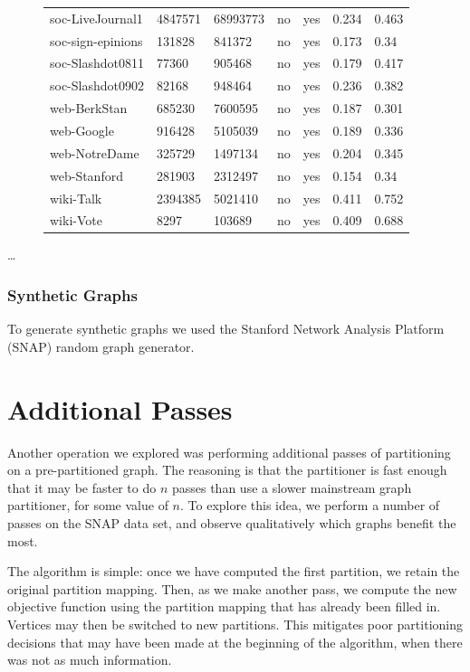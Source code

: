 \documentclass[11pt]{article}
\begin{document}
\begin{figure}
{\begin{tabular}{ *7l }
soc-LiveJournal1 & 4847571 & 68993773 & no & yes &0.234& 0.463\\ 
soc-sign-epinions & 131828 & 841372 & no & yes &0.173&0.34\\ 
soc-Slashdot0811 & 77360 & 905468 & no & yes &0.179&0.417\\ 
soc-Slashdot0902 & 82168 & 948464 & no & yes &0.236&0.382\\ 
web-BerkStan & 685230 & 7600595 & no & yes &0.187&0.301\\ 
web-Google & 916428 & 5105039 & no & yes &0.189&0.336\\ 
web-NotreDame & 325729 & 1497134 & no & yes &0.204&0.345\\ 
web-Stanford & 281903 & 2312497 & no & yes &0.154&0.34\\ 
wiki-Talk & 2394385 & 5021410 & no & yes &0.411&0.752\\ 
wiki-Vote  & 8297 & 103689 & no & yes &0.409&0.688\\ 
 \hline
\end{tabular}\par
}
\end{figure}

\dots

\subsubsection{Synthetic Graphs}
To generate synthetic graphs we used the Stanford Network Analysis Platform (SNAP) random graph generator.

\section{Additional Passes}
Another operation we explored was performing additional passes of partitioning on a pre-partitioned graph. The reasoning is that the partitioner is fast enough that it may be faster to do $n$ passes than use a slower mainstream graph partitioner, for some value of $n$. To explore this idea, we perform a number of passes on the SNAP data set, and observe qualitatively which graphs benefit the most. 

The algorithm is simple: once we have computed the first partition, we retain the original partition mapping. Then, as we make another pass, we compute the new objective function using the partition mapping that has already been filled in. Vertices may then be switched to new partitions. This mitigates poor partitioning decisions that may have been made at the beginning of the algorithm, when there was not as much information. 
\end{document}
